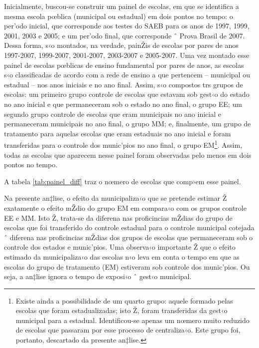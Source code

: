 \documentclass[a4paper, 12pt]{article}
\begin{document}
Inicialmente, buscou-se construir um painel de escolas, em que se identifica a mesma escola pœblica (municipal ou estadual) em dois pontos no tempo: o per’odo inicial, que corresponde aos testes do SAEB para os anos de 1997, 1999, 2001, 2003 e 2005; e um per’odo final, que corresponde ˆ Prova Brasil de 2007. Dessa forma, s‹o montados, na verdade, painŽis de escolas por pares de anos 1997-2007, 1999-2007, 2001-2007, 2003-2007 e 2005-2007. Uma vez montado esse painel de escolas pœblicas de ensino fundamental por pares de anos, as escolas s‹o classificadas de acordo com a rede de ensino a que pertencem -- municipal  ou estadual -- nos anos iniciais e no ano final. Assim, s‹o compostos trs grupos de escolas: um primeiro grupo controle de escolas que estavam sob gest‹o do estado no ano inicial e que permaneceram sob o estado no ano final, o grupo EE; um segundo grupo controle de escolas que eram municipais no ano inicial e permaneceram municipais no ano final, o grupo MM; e, finalmente, um grupo de tratamento para aquelas escolas que eram estaduais no ano inicial e foram transferidas para o controle dos munic’pios no ano final, o grupo EM\footnote{Existe ainda a possibilidade de um quarto grupo: aquele formado pelas escolas que foram estadualizadas; isto Ž, foram transferidas da gest‹o municipal para a estadual. Identificou-se apenas um nœmero muito reduzido de escolas que passaram por esse processo de centraliza‹o. Este grupo foi, portanto, descartado da presente an‡lise.}. Assim, todas as escolas que aparecem nesse painel foram observadas pelo menos em dois pontos no tempo.

A tabela \ref{tab:painel_diff} traz o nœmero de escolas que comp›em esse painel. 

 


Na presente an‡lise, o efeito da municipaliza‹o que se pretende estimar Ž exatamente o efeito mŽdio do grupo EM em compara‹o com os grupos controle EE e MM. Isto Ž, trata-se da diferena nas proficincias mŽdias do grupo de escolas que foi transferido do controle estadual para o controle municipal cotejada ˆ diferena nas proficincias mŽdias dos grupos  de escolas que permaneceram sob o controle dos estados e munic’pios. Uma observa‹o importante Ž que o efeito estimado da municipaliza‹o das escolas n‹o leva em conta o tempo em que as escolas do grupo de tratamento (EM) estiveram sob controle dos munic’pios. Ou seja, a an‡lise ignora o tempo de exposi‹o ˆ gest‹o municipal.
\end{document}
